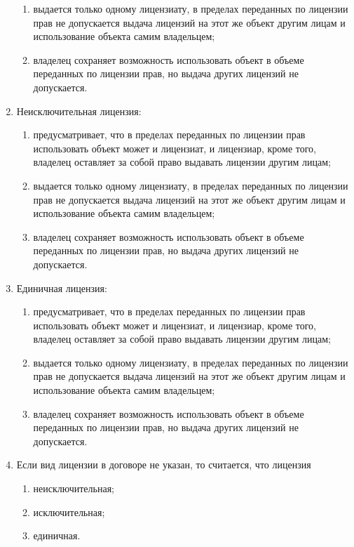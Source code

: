 \begin{enumerate}
\begin{enumerate}
        \item \cmark выдается только одному лицензиату, в пределах переданных по лицензии прав не допускается выдача лицензий на этот же объект другим лицам и использование объекта самим владельцем; 
        \item владелец сохраняет возможность использовать объект в объеме переданных по лицензии прав, но выдача других лицензий не допускается.
    \end{enumerate}
    \item Неисключительная лицензия:
    \begin{enumerate}
        \item \cmark предусматривает, что в пределах переданных по лицензии прав использовать объект может и лицензиат, и лицензиар, кроме того, владелец оставляет за собой право выдавать лицензии другим лицам; 
        \item выдается только одному лицензиату, в пределах переданных по лицензии прав не допускается выдача лицензий на этот же объект другим лицам и использование объекта самим владельцем; 
        \item владелец сохраняет возможность использовать объект в объеме переданных по лицензии прав, но выдача других лицензий не допускается.
    \end{enumerate}
    \item Единичная лицензия:
    \begin{enumerate}
        \item предусматривает, что в пределах переданных по лицензии прав использовать объект может и лицензиат, и лицензиар, кроме того, владелец оставляет за собой право выдавать лицензии другим лицам; 
        \item выдается только одному лицензиату, в пределах переданных по лицензии прав не допускается выдача лицензий на этот же объект другим лицам и использование объекта самим владельцем; 
        \item \cmark владелец сохраняет возможность использовать объект в объеме переданных по лицензии прав, но выдача других лицензий не допускается.
    \end{enumerate}
    \item Если вид лицензии в договоре не указан, то считается, что лицензия
    \begin{enumerate}
        \item \cmark неисключительная;
        \item исключительная;
        \item единичная.

\end{enumerate}
\end{enumerate}
